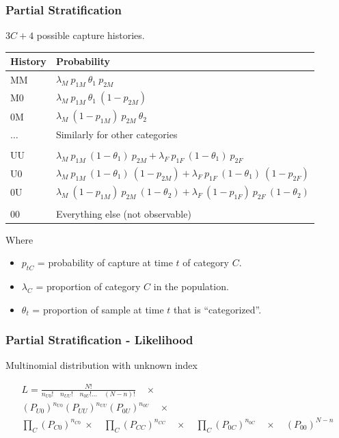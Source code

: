 \documentclass{beamer}
\begin{document}
\begin{frame} \frametitle{Partial Stratification}

$3C + 4$ possible capture histories.\\[2mm]

\begin{tabular}{ll} \hline
History & Probability \\ \hline
MM     &  $\lambda_{M}\  p_{1M} \ \theta_1 \ p_{2M}$ \\ 
M0      &  $\lambda_{M} \ p_{1M} \ \theta_1 \ (1-p_{2M})$ \\
0M      &  $\lambda_{M} \ (1-p_{1M})\ p_{2M}\ \theta_{2} $\\
$\ldots$ & Similarly for other categories \\
\\
UU      &  $\lambda_{M} \ p_{1M}\ (1-\theta_1)\ p_{2M} + \lambda_{F} \ p_{1F} \ (1-\theta_1) \ p_{2F}$ \\
U0      &  $\lambda_{M} \ p_{1M}\ (1-\theta_1)\ (1-p_{2M}) + \lambda_{F} \ p_{1F} \ (1-\theta_1) \ (1-p_{2F})$ \\
0U      &  $\lambda_{M} \ (1-p_{1M}) \ p_{2M} \ (1-\theta_2) + \lambda_{F} \ (1-p_{1F}) \ p_{2F} \ (1-\theta_2)$ \\
 \\
00   &  Everything else (not observable) \\ \hline
\end{tabular}
Where
\begin{itemize}
\item $p_{tC}$ = probability of capture at time $t$ of category $C$.
\item $\lambda_C$ = proportion of category $C$ in the population.
\item $\theta_t$ = proportion of sample at time $t$ that is ``categorized''.
\end{itemize} 
\end{frame}



\begin{frame} \frametitle{Partial Stratification - Likelihood }

Multinomial distribution with unknown index\\
\vspace{6pt}

 \begin{multline*}
L = \frac{N!}{n_{U0}!\quad n_{UU}!\quad n_{0U}! \ldots \quad (N-n)!} \quad \times \\
 (P_{U0})^{n_{U0}}(P_{UU})^{n_{UU}}(P_{0U})^{n_{0U}} \quad \times \\
\prod_{C} (P_{C0})^{n_{C0}} \  \times \quad
 \prod_{C} (P_{CC})^{n_{ CC}} \quad \times
\quad \prod_{C} (P_{0C})^{n_{0C}} \quad \times \quad (P_{00})^{N-n}\\
 \end{multline*}
\end{frame}
\end{document}
